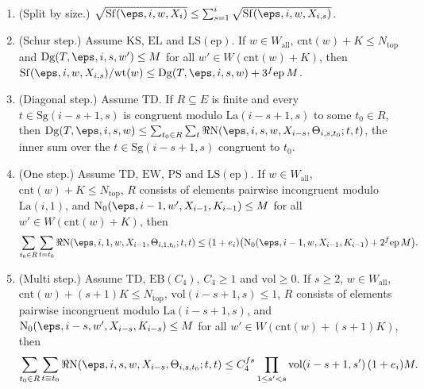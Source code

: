 \begin{lemma}\label{pf:thmS:fivesteps}
\begin{enumerate}
\item (Split by size.) $\sqrt{\thmSSf(\eps,i,w,X_i)}\le\sum_{s=1}^i\sqrt{\thmSSf(\eps,i,w,X_{i,s})}$.
\item (Schur step.) Assume $\mathrm{KS}$, $\mathrm{EL}$ and $\mathrm{LS}(\mathrm{ep})$. If
$w\in W_{\mathrm{all}}$, $\mathrm{cnt}(w)+K\le N_{\mathrm{top}}$ and $\thmSDg(T,\eps,i,s,w')\le M$ for all
$w'\in W(\mathrm{cnt}(w)+K)$, then $\thmSSf(\eps,i,w,X_{i,s})/\mathrm{wt}(w)\le\thmSDg(T,\eps,i,s,w)+3^f\mathrm{ep}\,M$.
\item (Diagonal step.) Assume $\mathrm{TD}$. If $R\subseteq E$ is finite and every
$t\in\mathrm{Sg}(i-s+1,s)$ is congruent modulo $\mathrm{La}(i-s+1,s)$ to some $t_0\in R$, then
$\thmSDg(T,\eps,i,s,w)\le\sum_{t_0\in R}\sum_{t}\Re\thmSNst(\eps,i,s,w,X_{i-s},\Theta_{i,s,t_0};t,t)$, the inner sum over the
$t\in\mathrm{Sg}(i-s+1,s)$ congruent to $t_0$.
\item (One step.) Assume $\mathrm{TD}$, $\mathrm{EW}$, $\mathrm{PS}$ and
$\mathrm{LS}(\mathrm{ep})$. If $w\in W_{\mathrm{all}}$, $\mathrm{cnt}(w)+K\le N_{\mathrm{top}}$, $R$ consists of
elements pairwise incongruent modulo $\mathrm{La}(i,1)$, and $\thmSNz(\eps,i-1,w',X_{i-1},K_{i-1})\le M$ for all
$w'\in W(\mathrm{cnt}(w)+K)$, then
\[
\sum_{t_0\in R}\sum_{t\equiv t_0}\Re\thmSNst(\eps,i,1,w,X_{i-1},\Theta_{i,1,t_0};t,t)\le(1+e_i)\bigl(\thmSNz(\eps,i-1,w,X_{i-1},K_{i-1})
+2^f\mathrm{ep}\,M\bigr).
\]
\item (Multi step.) Assume $\mathrm{TD}$, $\mathrm{EB}(C_4)$, $C_4\ge1$ and $\mathrm{vol}\ge0$. If
$s\ge2$, $w\in W_{\mathrm{all}}$, $\mathrm{cnt}(w)+(s+1)K\le N_{\mathrm{top}}$, $\mathrm{vol}(i-s+1,s)\le1$, $R$ consists of
elements pairwise incongruent modulo $\mathrm{La}(i-s+1,s)$, and $\thmSNz(\eps,i-s,w',X_{i-s},K_{i-s})\le M$ for all
$w'\in W(\mathrm{cnt}(w)+(s+1)K)$, then
\[
\sum_{t_0\in R}\sum_{t\equiv t_0}\Re\thmSNst(\eps,i,s,w,X_{i-s},\Theta_{i,s,t_0};t,t)\le C_4^{fs}\prod_{1\le s'<s}
\mathrm{vol}(i-s+1,s')\,(1+e_i)M.
\]
\end{enumerate}
\end{lemma}

